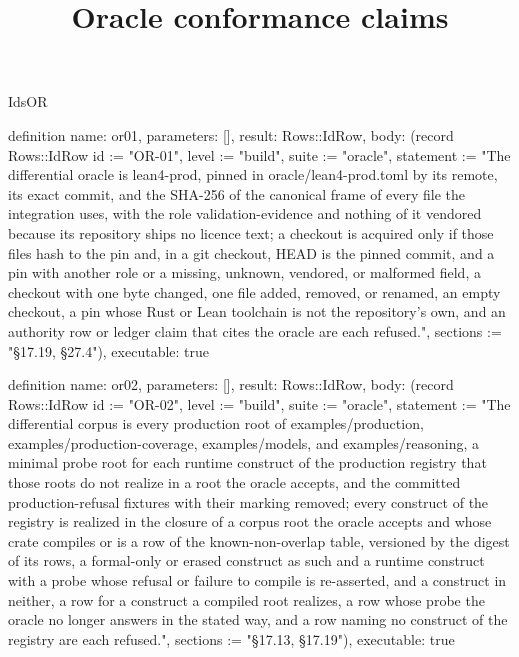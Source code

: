 \begin{lexlean}{IdsOR}
\title{Oracle conformance claims}
\begin{semanticmodule}
definition{
  name: or01,
  parameters: [],
  result: Rows::IdRow,
  body: (record Rows::IdRow {id := "OR-01", level := "build", suite := "oracle", statement := "The differential oracle is lean4-prod, pinned in oracle/lean4-prod.toml by its remote, its exact commit, and the SHA-256 of the canonical frame of every file the integration uses, with the role validation-evidence and nothing of it vendored because its repository ships no licence text; a checkout is acquired only if those files hash to the pin and, in a git checkout, HEAD is the pinned commit, and a pin with another role or a missing, unknown, vendored, or malformed field, a checkout with one byte changed, one file added, removed, or renamed, an empty checkout, a pin whose Rust or Lean toolchain is not the repository's own, and an authority row or ledger claim that cites the oracle are each refused.", sections := "§17.19, §27.4"}),
  executable: true
}

definition{
  name: or02,
  parameters: [],
  result: Rows::IdRow,
  body: (record Rows::IdRow {id := "OR-02", level := "build", suite := "oracle", statement := "The differential corpus is every production root of examples/production, examples/production-coverage, examples/models, and examples/reasoning, a minimal probe root for each runtime construct of the production registry that those roots do not realize in a root the oracle accepts, and the committed production-refusal fixtures with their marking removed; every construct of the registry is realized in the closure of a corpus root the oracle accepts and whose crate compiles or is a row of the known-non-overlap table, versioned by the digest of its rows, a formal-only or erased construct as such and a runtime construct with a probe whose refusal or failure to compile is re-asserted, and a construct in neither, a row for a construct a compiled root realizes, a row whose probe the oracle no longer answers in the stated way, and a row naming no construct of the registry are each refused.", sections := "§17.13, §17.19"}),
  executable: true
}


\end{semanticmodule}
\end{lexlean}
